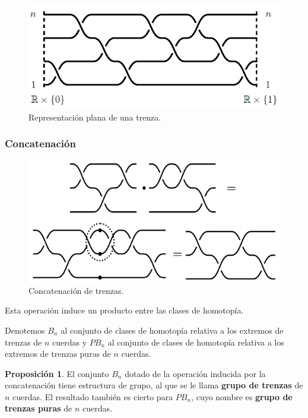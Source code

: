 \documentclass{beamer}
\theoremstyle{definition}
\newtheorem{prop}[teorema]{Proposición}
\begin{document}
\begin{frame}
\begin{figure}[h!]
\includegraphics[scale=0.6]{Imagenes/Diapplana}
\caption{Representación plana de una trenza.}
\end{figure}
\end{frame}

\begin{frame}
\frametitle{Concatenación}
\begin{figure}[h!]
\includegraphics[scale=0.5]{Imagenes/Diapconca}
\caption{Concatenación de trenzas.}
\end{figure}
Esta operación induce un producto entre las clases de homotopía.
\end{frame}

\begin{frame}
Denotemos $B_n$ al conjunto de clases de homotopía relativa a los extremos de trenzas de $n$ cuerdas y $PB_n$ al conjunto de clases de homotopía relativa a los extremos de trenzas puras de $n$ cuerdas.

\begin{prop}
El conjunto $B_n$ dotado de la operación inducida por la concatenación tiene estructura de grupo, al que se le llama \textbf{grupo de trenzas} de $n$ cuerdas. El resultado también es cierto para $PB_n$, cuyo nombre es \textbf{grupo de trenzas puras} de $n$ cuerdas. 
\end{prop}
\end{frame}
\end{document}
